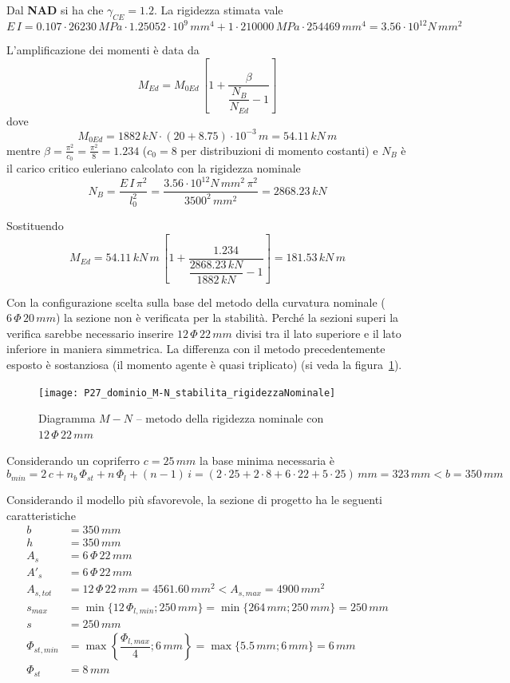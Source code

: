Dal \textbf{NAD} si ha che $\gamma_{CE} = 1.2$.
La rigidezza stimata vale
\[
E\,I = 0.107\cdot 26230\,MPa\cdot 1.25052\cdot 10^9\,mm^4 + 1\cdot210000\,MPa\cdot254469\,mm^4 = 3.56\cdot 10^{12} N\,mm^2 
\]

L'amplificazione dei momenti è data da
\begin{equation}
    \label{eq:amplificazione_momenti}
	M_{Ed} = M_{0Ed}\,\left[1 + \dfrac{\beta}{\dfrac{N_B}{N_{Ed}}-1}\right]
\end{equation}
dove 
\[ M_{0Ed} = 1882\,kN\cdot (20+8.75)\cdot 10^{-3}\,m = 54.11\,kN\,m\]
mentre $\beta=\frac{\pi^2}{c_0} = \frac{\pi^2}{8} = 1.234$ ($c_0=8$ per distribuzioni di momento costanti) e $N_B$ è il carico critico euleriano calcolato con la rigidezza nominale
\[
N_B = \dfrac{E\,I\,\pi^2}{l_0^2} = \dfrac{3.56\cdot 10^{12} N\,mm^2\,\pi^2}{3500^2\,mm^2} = 2868.23\,kN
\]

Sostituendo
\[
M_{Ed} = 54.11\,kN\,m\,\left[1+\dfrac{1.234}{\dfrac{2868.23\,kN}{1882\,kN}-1}\right] = 181.53\,kN\,m
\]

Con la configurazione scelta sulla base del metodo della curvatura nominale ($6\,\Phi\,20\,mm$) la sezione non è verificata per la stabilità. Perché la sezioni superi la verifica sarebbe necessario inserire $12\,\Phi\,22\,mm$ divisi tra il lato superiore e il lato inferiore in maniera simmetrica. La differenza con il metodo precedentemente esposto è sostanziosa (il momento agente è quasi triplicato) (si veda la figura~\ref{fig:diagramma_M-N_rigidezzaNominale}).
 
\begin{figure}
    \centering
	\texttt{[image: P27\_dominio\_M-N\_stabilita\_rigidezzaNominale]}
	\caption{Diagramma $M-N$ -- metodo della rigidezza nominale con $12\,\Phi\,22\,mm$}
	\label{fig:diagramma_M-N_rigidezzaNominale}
\end{figure}

Considerando un copriferro $c = 25\,mm$ la base minima necessaria è
\[
b_{min} = 2\,c + n_b\,\Phi_{st} + n\, \Phi_l + (n-1)\,i = (2\cdot 25 + 2\cdot 8 + 6\cdot 22 + 5\cdot 25)\,mm = 323\,mm < b = 350\,mm
\]

Considerando il modello più sfavorevole, la sezione di progetto ha le seguenti caratteristiche
\begin{align*}
    b &= 350\,mm\\
	h &= 350\,mm\\
	A_s &= 6\,\Phi\,22\,mm\\
	A'_s &= 6\,\Phi\,22\,mm\\
	A_{s,tot} &= 12\,\Phi\,22\,mm = 4561.60\,mm^2 < A_{s,max} = 4900\,mm^2\\
	s_{max} &= \min\{12\,\Phi_{l,min}; 250\,mm\} = \min\{264\,mm; 250\,mm\} = 250\,mm \\
	s &= 250\,mm\\
	\Phi_{st,min} &= \max\left\{\dfrac{\Phi_{l,max}}{4}; 6\,mm\right\} = \max\{5.5\,mm; 6\,mm\} = 6\,mm\\
	\Phi_{st}&=  8\,mm
\end{align*}

